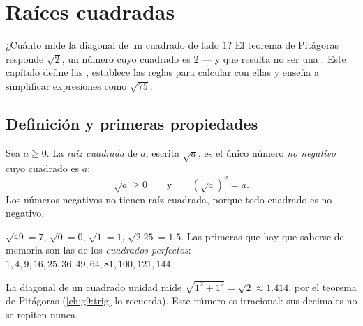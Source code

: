 \chapter{Raíces cuadradas}\label{ch:g9:sqrt}

¿Cuánto mide la diagonal de un cuadrado de lado $1$? El teorema de Pitágoras
responde $\sqrt 2$, un número cuyo cuadrado es $2$ --- y que resulta
no ser una . Este capítulo define las , establece las
reglas para calcular con ellas y enseña a simplificar expresiones
como $\sqrt{75}$.

\section{Definición y primeras propiedades}

\begin{definition}\label{def:g9:sqrt:def}
Sea $a \geq 0$. La \emph{raíz cuadrada} de $a$, escrita
$\sqrt a$, es el único número \emph{no negativo} cuyo cuadrado es $a$:
\[
\sqrt a \geq 0
\qquad\text{y}\qquad
\left(\sqrt a\right)^2 = a .
\]
Los números negativos no tienen raíz cuadrada, porque todo cuadrado es no negativo.
\end{definition}

\begin{example}
$\sqrt{49} = 7$, $\sqrt 0 = 0$, $\sqrt 1 = 1$,
$\sqrt{2.25} = 1.5$. Las primeras  que hay que saberse de memoria son las de
los \emph{cuadrados perfectos}: $1, 4, 9, 16, 25, 36, 49, 64, 81, 100, 121,
144$.
\end{example}

\begin{omfigure}

{\small La diagonal de un cuadrado unidad mide $\sqrt{1^2 + 1^2} =
\sqrt2 \approx 1.414$, por el teorema de Pitágoras
(\cref{ch:g9:trig} lo recuerda). Este número es irracional: sus decimales
no se repiten nunca.}
\end{omfigure}

